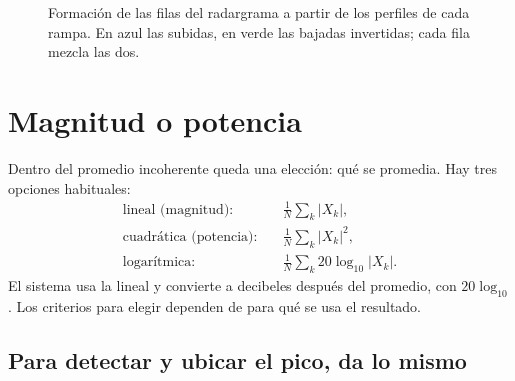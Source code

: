 \begin{figure}[H]
  \centering
  \caption{Formación de las filas del radargrama a partir de los perfiles de
  cada rampa. En azul las subidas, en verde las bajadas invertidas; cada fila
  mezcla las dos.}
  \label{fig:proc_filas}
\end{figure}

\section{Magnitud o potencia}
\label{sec:proc_mag_pot}

Dentro del promedio incoherente queda una elección: qué se promedia. Hay
tres opciones habituales:
\begin{align}
  \text{lineal (magnitud):}\quad   & \textstyle \frac{1}{N}\sum_k \lvert X_k\rvert,
  \label{eq:proc_lineal}\\
  \text{cuadrática (potencia):}\quad & \textstyle \frac{1}{N}\sum_k \lvert X_k\rvert^2,
  \label{eq:proc_cuadratica}\\
  \text{logarítmica:}\quad          & \textstyle \frac{1}{N}\sum_k 20\log_{10}\lvert X_k\rvert.
  \label{eq:proc_log}
\end{align}
El sistema usa la lineal y convierte a decibeles después del promedio, con
$20\log_{10}$. Los criterios para elegir dependen de para qué se usa el
resultado.

\subsection{Para detectar y ubicar el pico, da lo mismo}

